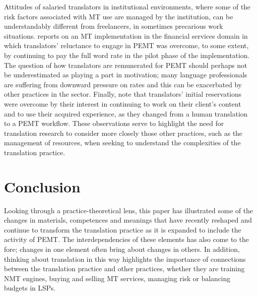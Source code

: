 \documentclass[output=paper,colorlinks,citecolor=brown]{langsci/langscibook}
\begin{document}
Attitudes of salaried translators in institutional environments, where some of the risk factors associated with MT use are managed by the institution, can be understandably different from freelancers, in sometimes precarious work situations. \citet{nunziatini_machine_2019} reports on an MT implementation in the financial services domain in which translators’ reluctance to engage in PEMT was overcome, to some extent, by continuing to pay the full word rate in the pilot phase of the implementation. The question of how translators are remunerated for PEMT should perhaps not be underestimated as playing a part in motivation; many language professionals are suffering from downward pressure on rates \citep[60]{pielmeier_state_2020} and this can be exacerbated by other practices in the sector. Finally, \citet{kosmaczewska_application_2019} note that translators’ initial reservations were overcome by their interest in continuing to work on their client’s content and to use their acquired experience, as they changed from a human translation to a PEMT workflow. These observations serve to highlight the need for translation research to consider more closely those other practices, such as the management of resources, when seeking to understand the complexities of the translation practice. 

\section{Conclusion}
Looking through a practice-theoretical lens, this paper has illustrated some of the changes in materials, competences and meanings that have recently reshaped and continue to transform the translation practice as it is expanded to include the activity of PEMT. The interdependencies of these elements has also come to the fore; changes in one element often bring about changes in others. In addition, thinking about translation in this way highlights the importance of connections between the translation practice and other practices, whether they are training NMT engines, buying and selling MT services, managing risk or balancing budgets in LSPs. 
\end{document}
